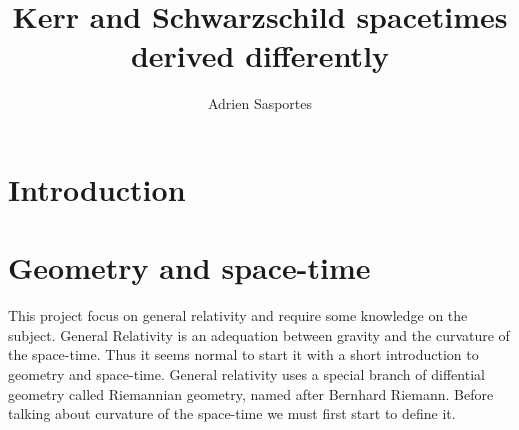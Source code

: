 \documentclass[a4paper,12pt]{article}
\title{Kerr and Schwarzschild spacetimes derived differently}
\author{Adrien Sasportes}
\theoremstyle{definition}
\begin{document}
\maketitle
{}
\newtheorem{definition}{Definition}

\section{Introduction}

\section{Geometry and space-time}
This project focus on general relativity and require some knowledge on the subject.
General Relativity is an adequation between gravity and the curvature of the space-time.
Thus it seems normal to start it with a short introduction to geometry and space-time.
General relativity uses a special branch of diffential geometry called Riemannian geometry, named after Bernhard Riemann.
Before talking about curvature of the space-time we must first start to define it.
\end{document}
